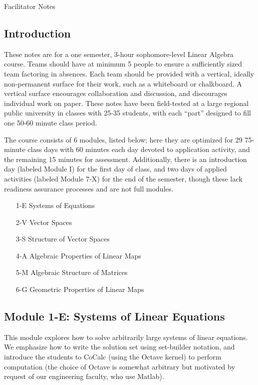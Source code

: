 \documentclass{article}
\begin{document}
\begin{center}
{\Large Facilitator Notes}
\end{center}

\subsection*{Introduction}

These notes are for a one semester, 3-hour sophomore-level Linear Algebra course.  Teams should have at minimum 5 people to ensure a sufficiently sized team factoring in absences.  Each team should be provided with a vertical, ideally non-permanent surface for their work, such as a whiteboard or chalkboard.  A vertical surface encourages collaboration and discussion, and discourages individual work on paper.  These notes have been field-tested at a large regional public university in classes with 25-35 students, with each ``part'' designed to fill one 50-60 minute class period.

The course consists of 6 modules, listed below; here they are optimized for 29 75-minute class days with 60 minutes each day devoted to application activity, and the remaining 15 minutes for assessment.  Additionally, there is an introduction day (labeled Module I) for the first day of class, and two days of applied activities (labeled Module 7-X) for the end of the semester, though these lack readiness assurance processes and are not full modules. 

\begin{enumerate}
\item [1-E] Systems of Equations
\item [2-V] Vector Spaces
\item [3-S] Structure of Vector Spaces
\item [4-A] Algebraic Properties of Linear Maps
\item [5-M] Algebraic Structure of Matrices
\item [6-G] Geometric Properties of Linear Maps
\end{enumerate}

\subsection*{Module 1-E: Systems of Linear Equations}
This module explores how to solve arbitrarily large systems of linear equations.  We emphasize how to write the solution set using set-builder notation, and introduce the students to CoCalc (using the Octave kernel) to perform computation (the choice of Octave is somewhat arbitrary but motivated by request of our engineering faculty, who use Matlab).  
\end{document}
